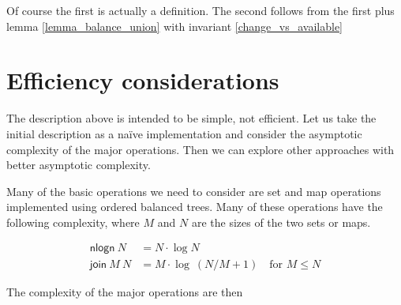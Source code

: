 \documentclass{article}
\begin{document}
Of course the first is actually a definition. The second follows from the
first plus lemma \ref{lemma_balance_union} with invariant \ref{change_vs_available}


\section{Efficiency considerations}

The description above is intended to be simple, not efficient. Let us take the
initial description as a na\"ive implementation and consider the asymptotic
complexity of the major operations. Then we can explore other approaches with
better asymptotic complexity.

Many of the basic operations we need to consider are set and map operations
implemented using ordered balanced trees. Many of these operations have the
following complexity, where $M$ and $N$ are the sizes of the two sets or maps.

\begin{equation*}
\begin{split}
\mathsf{nlogn} ~ N & = N \cdot \log N \\
\mathsf{join} ~ M ~ N & = M \cdot \log ~ (N/M + 1) \quad \text{for } M \leq N
\end{split}
\end{equation*}

The complexity of the major operations are then
\end{document}

